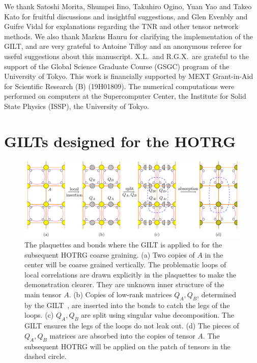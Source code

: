 \documentclass[aps,prr,reprint,superscriptaddress,nofootinbib,floatfix]{revtex4-2}
\begin{document}
\begin{acknowledgments}
We thank Satoshi Morita, Shumpei Iino, Takuhiro Ogino, Yuan Yao and Takeo Kato for fruitful discussions and insightful suggestions, and Glen Evenbly and Guifre Vidal for explanations regarding the TNR and other tensor network methods. 
We also thank Markus Hauru for clarifying the implementation of the GILT, and are very grateful to Antoine Tilloy and an anonymous referee for useful suggestions about this manuscript.
X.L.\ and R.G.X.\ are grateful to the support of the Global Science Graduate Course (GSGC) program of the University of Tokyo. 
This work is financially supported by MEXT Grant-in-Aid for Scientific Research (B) (19H01809).
The numerical computations were performed on computers at the Supercomputer Center, the Institute for Solid State Physics (ISSP), the University of Tokyo.

\end{acknowledgments}

\appendix
\section{GILTs designed for the HOTRG\label{append:gilthotrg}}
%
\begin{figure}[!t]
\includegraphics[scale=1.0,valign=c]{gilt4hotrg.pdf}
\caption{\label{fig:gilt4hotrg}
    The plaquettes and bonds where the GILT is applied to for the subsequent HOTRG coarse graining.
    (a) Two copies of $A$ in the center will be coarse grained vertically. 
    The problematic loops of local correlations are drawn explicitly in the plaquettes to make the demonstration clearer.
    They are unknown inner structure of the main tensor $A$.
    (b) Copies of low-rank matrices $Q_A,Q_B$, determined by the GILT~\cite{gilts}, are inserted into the bonds to catch the legs of the loops.
    (c) $Q_A,Q_B$ are split using singular value decomposition. The GILT ensures the legs of the loops do not leak out.
    (d) The pieces of $Q_A,Q_B$ matrices are absorbed into the copies of tensor $A$. The subsequent HOTRG will be applied on the patch of tensors in the dashed circle.
}
\end{figure}
%
\end{document}
